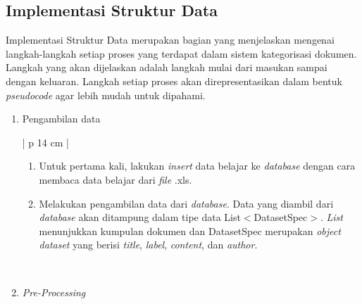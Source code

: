 \subsection{Implementasi Struktur Data}
\indent
Implementasi Struktur Data merupakan bagian yang menjelaskan mengenai langkah-langkah setiap proses yang terdapat dalam sistem kategorisasi dokumen. Langkah yang akan dijelaskan adalah langkah mulai dari masukan sampai dengan keluaran. Langkah setiap proses akan direpresentasikan dalam bentuk {\itshape pseudocode} agar lebih mudah untuk dipahami.

\begin{enumerate}[nolistsep,leftmargin=0.5cm]
\item
Pengambilan data

\begin{table}[H]
\small
\centering
\begin{adjustbox}{width=1\textwidth}
\begin{tabular}{| p {14 cm} |}
\hline
\begin{enumerate}[nolistsep,leftmargin=0.7cm]
\item
Untuk pertama kali, lakukan {\itshape insert} data belajar ke {\itshape database} dengan cara membaca data belajar dari {\itshape file} .xls.
\item
Melakukan pengambilan data dari {\itshape database}. Data yang diambil dari {\itshape database} akan ditampung dalam tipe data List$<$DatasetSpec$>$. {\itshape List} menunjukkan kumpulan dokumen dan DatasetSpec merupakan {\itshape object dataset} yang berisi {\itshape title}, {\itshape label}, {\itshape content}, dan {\itshape author}.
\end{enumerate} \\
\hline
\end{tabular}
\end{adjustbox}
\end{table}

\item
{\itshape Pre-Processing}


\end{enumerate}
